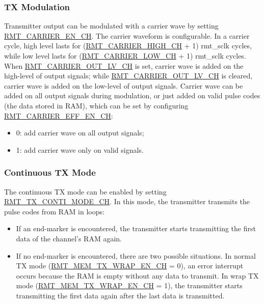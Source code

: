 \documentclass[main\_\_EN.tex]{subfiles}
\begin{document}
\subsubsection{TX Modulation}

Transmitter output can be modulated with a carrier wave by setting  \hyperref[fielddesc:RMTCARRIERENCHN]{RMT\_CARRIER\_EN\_CH}. The carrier waveform is configurable. 
In a carrier cycle, high level lasts for (\hyperref[fielddesc:RMTCARRIERHIGHCHN]{RMT\_CARRIER\_HIGH\_CH} + 1) rmt\_sclk cycles, while low level lasts for (\hyperref[fielddesc:RMTCARRIERLOWCHN]{RMT\_CARRIER\_LOW\_CH} + 1) rmt\_sclk cycles. When  \hyperref[fielddesc:RMTCARRIEROUTLVCHN]{RMT\_CARRIER\_OUT\_LV\_CH} is set, carrier wave is added on the high-level of output signals; while  \hyperref[fielddesc:RMTCARRIEROUTLVCHN]{RMT\_CARRIER\_OUT\_LV\_CH} is cleared, carrier wave is added on the low-level of output signals. 
Carrier wave can be added on all output signals during modulation, or just added on valid pulse codes (the data stored in RAM), which can be set by configuring \hyperref[fielddesc:RMTCARRIEREFFENCHN]{RMT\_CARRIER\_EFF\_EN\_CH}: 
\begin{itemize}
    \item 0: add carrier wave on all output signals;
    \item 1: add carrier wave only on valid signals.
\end{itemize}


\subsubsection{Continuous TX Mode}

The continuous TX mode can be enabled by setting \hyperref[fielddesc:RMTTXCONTIMODECHN]{RMT\_TX\_CONTI\_MODE\_CH}. In this mode, the transmitter transmits the pulse codes from RAM in loops:
\begin{itemize}
    \item If an end-marker is encountered, the transmitter starts transmitting the first data of the channel's RAM again. 
    \item If no end-marker is encountered, there are two possible situations. In normal TX mode (\hyperref[fielddesc:RMTMEMTXWRAPENCHN]{RMT\_MEM\_TX\_WRAP\_EN\_CH} = 0), an error interrupt occurs because the RAM is empty without any data to transmit. In wrap TX mode (\hyperref[fielddesc:RMTMEMTXWRAPENCHN]{RMT\_MEM\_TX\_WRAP\_EN\_CH} = 1), the transmitter starts transmitting the first data again after the last data is transmitted.
\end{itemize}
\end{document}
